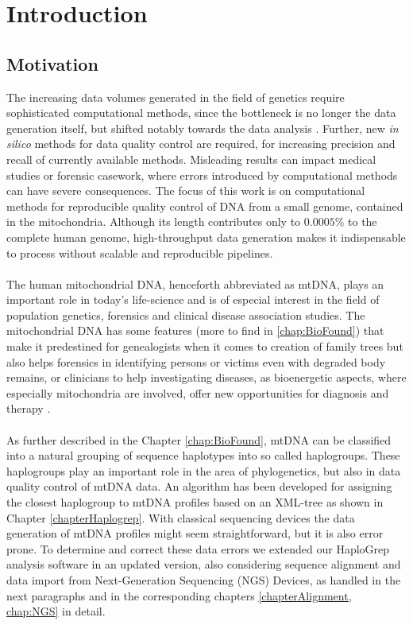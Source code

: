 \chapter{Introduction}
\label{chapterIntro}
\section{Motivation}
The increasing data volumes generated in the field of genetics require sophisticated computational methods, since the bottleneck is no longer the data generation itself, but shifted notably towards the data analysis \cite{Forer2016}. Further, new \textit{in silico} methods for data quality control are required, for increasing precision and recall of currently available methods. Misleading results can impact medical studies or forensic casework, where errors introduced by computational methods can have severe consequences. The focus of this work is on computational methods for reproducible quality control of DNA from a small genome, contained in the mitochondria. Although its length contributes only to $0.0005\%$ to the complete human genome, high-throughput data generation makes it indispensable to process without scalable and reproducible pipelines. 
\\
\\
The human mitochondrial DNA, henceforth abbreviated as mtDNA, plays an important role in today's life-science and is of especial interest in the field of population genetics, forensics and clinical disease association studies. The mitochondrial DNA has some features (more to find in \ref{chap:BioFound}) that make it predestined for genealogists when it comes to creation of family trees but also helps forensics in identifying persons or victims even with degraded body remains, or clinicians to help investigating diseases, as bioenergetic aspects, where especially mitochondria are involved, offer new opportunities for diagnosis and therapy \cite{Picard2016}.
\\
\\
As further described in the Chapter \ref{chap:BioFound}, mtDNA can be classified into a natural grouping of sequence haplotypes into so called haplogroups. These haplogroups play an important role in the area of phylogenetics, but also in data quality control of mtDNA data. An algorithm has been developed for assigning the closest haplogroup to mtDNA profiles based on an XML-tree as shown in Chapter \ref{chapterHaplogrep}. With classical sequencing devices the data generation of mtDNA profiles might seem straightforward, but it is also error prone. To determine and correct these data errors we extended our HaploGrep analysis software in an updated version, also considering sequence alignment and data import from Next-Generation Sequencing (NGS) Devices, as handled in the next paragraphs and in the corresponding chapters \ref{chapterAlignment, chap:NGS} in detail.
